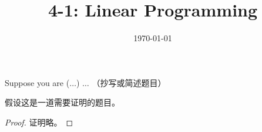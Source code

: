 \documentclass[11pt, a4paper, UTF8]{ctexart}
\title{4-1: Linear Programming}
\date{\today}     %
\begin{document}
\maketitle
\noplagiarism	%

\beforeclasshw
\begin{problem}[UD: 1.5]	%
  Suppose you are ($\ldots$) $\ldots$ （抄写或简述题目）
\end{problem}

\begin{solution}
\end{solution}

\afterclasshw

\begin{problem}[UD: x.x]
  假设这是一道需要证明的题目。	
\end{problem}

\begin{proof}
  证明略。	
\end{proof}
\end{document}
